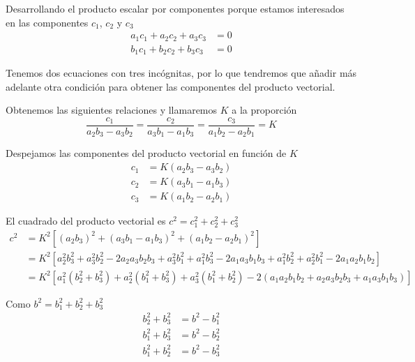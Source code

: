 \documentclass[a4paper,10pt]{article}
\begin{document}
\begin{soluc}
\begin{itemize}
    Desarrollando el producto escalar por componentes porque estamos interesados
    en las componentes $c_{1}$, $c_{2}$ y $c_{3}$
    \begin{align*}
      a_{1} c_{1} + a_{2} c_{2} + a_{3} c_{3} &= 0\\
      b_{1} c_{1} + b_{2} c_{2} + b_{3} c_{3} &= 0
    \end{align*}

    Tenemos dos ecuaciones con tres incógnitas, por lo que tendremos que
    añadir más adelante otra condición para obtener las componentes del producto
    vectorial.

    Obtenemos las siguientes relaciones y llamaremos $K$ a la proporción
    \[
      \frac{c_{1}}{a_{2}b_{3}-a_{3}b_{2}}
      =
      \frac{c_{2}}{a_{3}b_{1}-a_{1}b_{3}}
      =
      \frac{c_{3}}{a_{1}b_{2}-a_{2}b_{1}}
      =
      K
    \]

    Despejamos las componentes del producto vectorial en función de $K$
    \begin{align*}
      c_{1} &= K(a_{2}b_{3} - a_{3}b_{2})\\
      c_{2} &= K(a_{3}b_{1} - a_{1}b_{3})\\
      c_{3} &= K(a_{1}b_{2} - a_{2}b_{1})
    \end{align*}

    El cuadrado del producto vectorial es $c^{2} = c_{1}^{2} + c_{2}^{2} + c_{3}^{2}$
    \begin{align*}
      c^{2}
      &=
        K^{2}\left[
          (a_{2}b_{3})^{2} + (a_{3}b_{1}-a_{1}b_{3})^{2} + (a_{1}b_{2}-a_{2}b_{1})^{2}
        \right]\\
      &=
        K^{2}\left[
        a_{2}^{2}b_{3}^{2} + a_{3}^{2}b_{2}^{2} - 2a_{2}a_{3}b_{2}b_{3}
        + a_{3}^{2}b_{1}^{2}+a_{1}^{2}b_{3}^{2} - 2a_{1}a_{3}b_{1}b_{3}
        + a_{1}^{2}b_{2}^{2}+a_{2}^{2}b_{1}^{2} - 2a_{1}a_{2}b_{1}b_{2}
        \right]\\
      &=K^{2}\left[
        a_{1}^{2}\left(b_{2}^{2} + b_{3}^{2}\right)
        + a_{2}^{2}\left(b_{1}^{2} + b_{3}^{2}\right)
        + a_{3}^{2}\left(b_{1}^{2} + b_{2}^{2}\right)
        - 2 (a_{1}a_{2}b_{1}b_{2} + a_{2}a_{3}b_{2}b_{3} + a_{1}a_{3}b_{1}b_{3})
        \right]
    \end{align*}

    Como $b^{2} = b_{1}^{2} + b_{2}^{2} + b_{3}^{2}$
    \begin{align*}
      b_{2}^{2} + b_{3}^{2} &= b^{2}-b_{1}^{2}\\
      b_{1}^{2} + b_{3}^{2} &= b^{2}-b_{2}^{2}\\
      b_{1}^{2} + b_{2}^{2} &= b^{2}-b_{3}^{2}\\
    \end{align*}


\end{itemize}
\end{soluc}
\end{document}
